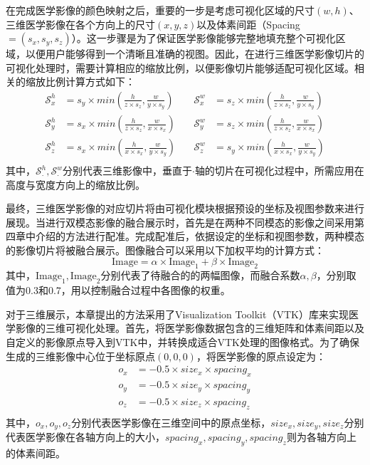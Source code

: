在完成医学影像的颜色映射之后，重要的一步是考虑可视化区域的尺寸\((w,h)\)、三维医学影像在各个方向上的尺寸\((x,y,z)\)以及体素间距（Spacing\(=(s_x,s_y,s_z)\)）。这一步骤是为了保证医学影像能够完整地填充整个可视化区域，以便用户能够得到一个清晰且准确的视图。因此，在进行三维医学影像切片的可视化处理时，需要计算相应的缩放比例，以便影像切片能够适配可视化区域。相关的缩放比例计算方式如下：
\begin{equation}
  \begin{aligned}
    \mathcal{S}_x^{h} & = s_y \times min(\frac{h}{z \times s_z}, \frac{w}{y \times s_y}) & \quad \mathcal{S}_x^{w} & = s_z \times min(\frac{h}{z \times s_z}, \frac{w}{y \times s_y}) \\
    \mathcal{S}_y^{h} & = s_x \times min(\frac{h}{z \times s_z}, \frac{w}{x \times s_x}) & \quad \mathcal{S}_y^{w} & = s_z \times min(\frac{h}{z \times s_z}, \frac{w}{x \times s_x}) \\
    \mathcal{S}_z^{h} & = s_x \times min(\frac{h}{x \times s_x}, \frac{w}{y \times s_y}) & \quad \mathcal{S}_z^{w} & = s_y \times min(\frac{h}{x \times s_x}, \frac{w}{y \times s_y}) \\
  \end{aligned}
  \label{eq:chap05_scale}
\end{equation}
其中，\(\mathcal{S}_\cdot^{h},\mathcal{S}_\cdot^{w}\)分别代表三维影像中，垂直于\(\cdot\)轴的切片在可视化过程中，所需应用在高度与宽度方向上的缩放比例。

最终，三维医学影像的对应切片将由可视化模块根据预设的坐标及视图参数来进行展现。当进行双模态影像的融合展示时，首先是在两种不同模态的影像之间采用第四章中介绍的方法进行配准。完成配准后，依据设定的坐标和视图参数，两种模态的影像切片将被融合展示。图像融合可以采用以下加权平均的计算方式：
\begin{equation}
  \text{Image} = \alpha \times \text{Image}_1 + \beta \times \text{Image}_2
  \label{eq:chap05_fusion}
\end{equation}
其中，\(\text{Image}_1,\text{Image}_2\)分别代表了待融合的的两幅图像，而融合系数\(\alpha, \beta\)，分别取值为0.3和0.7，用以控制融合过程中各图像的权重。

对于三维展示，本章提出的方法采用了Visualization Toolkit（VTK）库来实现医学影像的三维可视化处理。首先，将医学影像数据包含的三维矩阵和体素间距以及自定义的影像原点导入到VTK中，并转换成适合VTK处理的图像格式。为了确保生成的三维影像中心位于坐标原点\((0,0,0)\)，将医学影像的原点设定为：
\begin{equation}
  \begin{aligned}
    o_x & = -0.5 \times size_x \times spacing_x \\
    o_y & = -0.5 \times size_y \times spacing_y \\
    o_z & = -0.5 \times size_z \times spacing_z \\
  \end{aligned}
\end{equation}
其中，\(o_x,o_y,o_z\)分别代表医学影像在三维空间中的原点坐标，\(size_x,size_y,size_z\)分别代表医学影像在各轴方向上的大小，\(spacing_x,spacing_y,spacing_z\)则为各轴方向上的体素间距。

